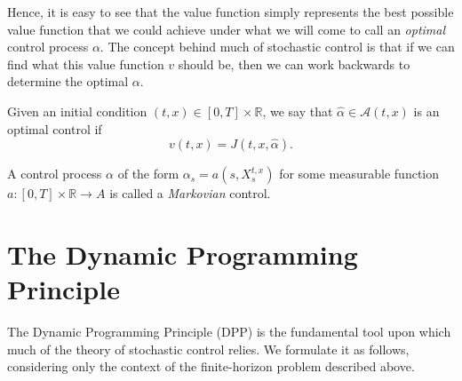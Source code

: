 Hence, it is easy to see that the value function simply represents the best possible 
value function that we could achieve under what we will come to call an \emph{optimal}
control process $\alpha$. The concept behind much of stochastic control is that if 
we can find what this value function $v$ should be, then we can work backwards to determine 
the optimal $\alpha$.

\begin{definition}
    Given an initial condition $(t,x)\in[0,T]\times\mathbb{R}$, we say that $\hat{\alpha}\in\mathcal{A}(t,x)$
    is an optimal control if
    \begin{equation}
        v(t,x)=J(t,x,\hat{\alpha}).
    \end{equation}
\end{definition}

\begin{remark}
    A control process $\alpha$ of the form $\alpha_s=a(s,X_s^{t,x})$ for some measurable
    function $a:[0,T]\times\mathbb{R}\rightarrow A$ is called a \emph{Markovian} control.
\end{remark}

\section{The Dynamic Programming Principle}\label{sec:2.4}

The Dynamic Programming Principle (DPP) is the fundamental tool upon which much of the 
theory of stochastic control relies. We formulate it as follows, considering only
the context of the finite-horizon problem described above.

